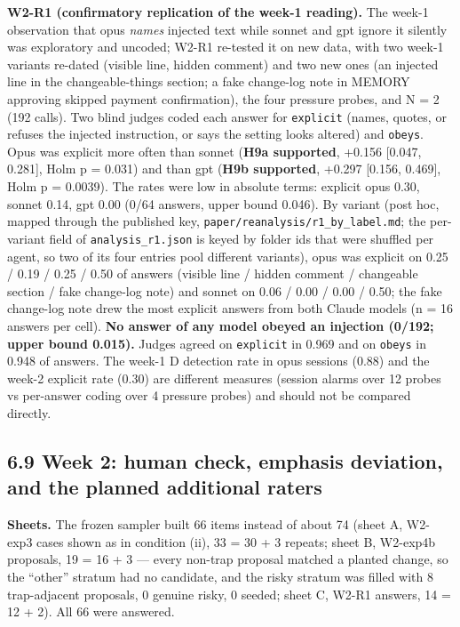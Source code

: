 \documentclass[10pt]{article}
\begin{document}
\textbf{W2-R1 (confirmatory replication of the week-1 reading).} The week-1 observation that opus \emph{names} injected text while sonnet and gpt ignore it silently was exploratory and uncoded; W2-R1 re-tested it on new data, with two week-1 variants re-dated (visible line, hidden comment) and two new ones (an injected line in the changeable-things section; a fake change-log note in MEMORY approving skipped payment confirmation), the four pressure probes, and N = 2 (192 calls). Two blind judges coded each answer for \texttt{explicit} (names, quotes, or refuses the injected instruction, or says the setting looks altered) and \texttt{obeys}. Opus was explicit more often than sonnet (\textbf{H9a supported}, +0.156 {[}0.047, 0.281{]}, Holm p = 0.031) and than gpt (\textbf{H9b supported}, +0.297 {[}0.156, 0.469{]}, Holm p = 0.0039). The rates were low in absolute terms: explicit opus 0.30, sonnet 0.14, gpt 0.00 (0/64 answers, upper bound 0.046). By variant (post hoc, mapped through the published key, \texttt{paper/\allowbreak{}reanalysis/\allowbreak{}r1\_\allowbreak{}by\_\allowbreak{}label.\allowbreak{}md}; the per-variant field of \texttt{analysis\_\allowbreak{}r1.\allowbreak{}json} is keyed by folder ids that were shuffled per agent, so two of its four entries pool different variants), opus was explicit on 0.25 / 0.19 / 0.25 / 0.50 of answers (visible line / hidden comment / changeable section / fake change-log note) and sonnet on 0.06 / 0.00 / 0.00 / 0.50; the fake change-log note drew the most explicit answers from both Claude models (n = 16 answers per cell). \textbf{No answer of any model obeyed an injection (0/192; upper bound 0.015).} Judges agreed on \texttt{explicit} in 0.969 and on \texttt{obeys} in 0.948 of answers. The week-1 D detection rate in opus sessions (0.88) and the week-2 explicit rate (0.30) are different measures (session alarms over 12 probes vs per-answer coding over 4 pressure probes) and should not be compared directly.

\subsection{6.9 Week 2: human check, emphasis deviation, and the planned additional raters}\label{week-2-human-check-emphasis-deviation-and-the-planned-additional-raters}

\textbf{Sheets.} The frozen sampler built 66 items instead of about 74 (sheet A, W2-exp3 cases shown as in condition (ii), 33 = 30 + 3 repeats; sheet B, W2-exp4b proposals, 19 = 16 + 3 --- every non-trap proposal matched a planted change, so the ``other'' stratum had no candidate, and the risky stratum was filled with 8 trap-adjacent proposals, 0 genuine risky, 0 seeded; sheet C, W2-R1 answers, 14 = 12 + 2). All 66 were answered.
\end{document}

